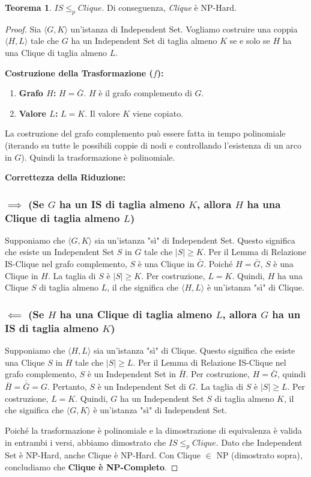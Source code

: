 \documentclass[a4paper]{article}
\theoremstyle{definition} %
\newtheorem{theorem}{Teorema}
[section]
\theoremstyle{definition} %
\begin{document}
\begin{theorem}
$IS \le_p Clique$. Di conseguenza, \emph{Clique} è NP-Hard.
\end{theorem}

\begin{proof}
Sia $\langle G, K \rangle$ un'istanza di Independent Set. Vogliamo costruire una coppia $\langle H, L \rangle$ tale che $G$ ha un Independent Set di taglia almeno $K$ se e solo se $H$ ha una Clique di taglia almeno $L$.

\textbf{Costruzione della Trasformazione ($f$):}
\begin{enumerate}
    \item \textbf{Grafo $H$:} $H = \bar{G}$. $H$ è il grafo complemento di $G$.
    \item \textbf{Valore $L$:} $L = K$. Il valore $K$ viene copiato.
\end{enumerate}
La costruzione del grafo complemento può essere fatta in tempo polinomiale (iterando su tutte le possibili coppie di nodi e controllando l'esistenza di un arco in $G$). Quindi la trasformazione è polinomiale.

\textbf{Correttezza della Riduzione:}

\subsubsection{$\implies$ (Se $G$ ha un IS di taglia almeno $K$, allora $H$ ha una Clique di taglia almeno $L$)}
Supponiamo che $\langle G, K \rangle$ sia un'istanza "sì" di Independent Set. Questo significa che esiste un Independent Set $S$ in $G$ tale che $|S| \ge K$.
Per il Lemma di Relazione IS-Clique nel grafo complemento, $S$ è una Clique in $\bar{G}$.
Poiché $H=\bar{G}$, $S$ è una Clique in $H$.
La taglia di $S$ è $|S| \ge K$. Per costruzione, $L=K$.
Quindi, $H$ ha una Clique $S$ di taglia almeno $L$, il che significa che $\langle H, L \rangle$ è un'istanza "sì" di Clique.

\subsubsection{$\impliedby$ (Se $H$ ha una Clique di taglia almeno $L$, allora $G$ ha un IS di taglia almeno $K$)}
Supponiamo che $\langle H, L \rangle$ sia un'istanza "sì" di Clique. Questo significa che esiste una Clique $S$ in $H$ tale che $|S| \ge L$.
Per il Lemma di Relazione IS-Clique nel grafo complemento, $S$ è un Independent Set in $\bar{H}$.
Per costruzione, $H=\bar{G}$, quindi $\bar{H} = \overline{\bar{G}} = G$.
Pertanto, $S$ è un Independent Set di $G$.
La taglia di $S$ è $|S| \ge L$. Per costruzione, $L=K$.
Quindi, $G$ ha un Independent Set $S$ di taglia almeno $K$, il che significa che $\langle G, K \rangle$ è un'istanza "sì" di Independent Set.

Poiché la trasformazione è polinomiale e la dimostrazione di equivalenza è valida in entrambi i versi, abbiamo dimostrato che $IS \le_p Clique$. Dato che Independent Set è NP-Hard, anche Clique è NP-Hard. Con Clique $\in$ NP (dimostrato sopra), concludiamo che \textbf{Clique è NP-Completo}.
\end{proof}
\end{document}
